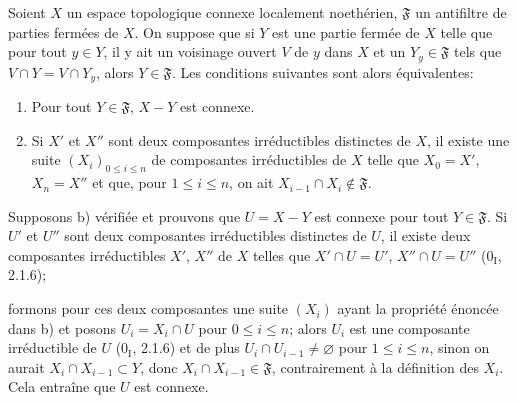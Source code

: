 \begin{lemma}[5.10.8.1]
\label{IV.2.s5.10.8.1-fr}
Soient $X$ un espace topologique connexe localement noethérien,
$\mathfrak F$ un antifiltre de parties fermées de $X$. On suppose que si $Y$
est une partie fermée de $X$ telle que pour tout $y\in Y$, il y ait un
voisinage ouvert $V$ de $y$ dans $X$ et un $Y_y\in\mathfrak F$ tels que
$V\cap Y=V\cap Y_y$, alors $Y\in\mathfrak F$. Les conditions suivantes sont
alors équivalentes:
\begin{enumerate}
\item[a)] Pour tout $Y\in\mathfrak F$, $X-Y$ est connexe.
\item[b)] Si $X'$ et $X''$ sont deux composantes irréductibles distinctes de
$X$, il existe une suite $(X_i)_{0\leq i\leq n}$ de composantes irréductibles
de $X$ telle que $X_0=X'$, $X_n=X''$ et que, pour $1\leq i\leq n$, on ait
$X_{i-1}\cap X_i\notin\mathfrak F$.
\end{enumerate}
\end{lemma}

Supposons b) vérifiée et prouvons que $U=X-Y$ est connexe pour tout
$Y\in\mathfrak F$. Si $U'$ et $U''$ sont deux composantes irréductibles
distinctes de $U$, il existe deux composantes irréductibles $X'$, $X''$ de
$X$ telles que $X'\cap U=U'$, $X''\cap U=U''$ (0$_\mathrm I$, 2.1.6);


formons pour ces deux composantes une suite $(X_i)$ ayant la propriété énoncée
dans b) et posons $U_i=X_i\cap U$ pour $0\leq i\leq n$; alors $U_i$ est une
composante irréductible de $U$ (0$_\mathrm I$, 2.1.6) et de plus
$U_i\cap U_{i-1}\neq\varnothing$ pour $1\leq i\leq n$, sinon on aurait
$X_i\cap X_{i-1}\subset Y$, donc $X_i\cap X_{i-1}\in\mathfrak F$,
contrairement à la définition des $X_i$. Cela entraîne que $U$ est connexe.

